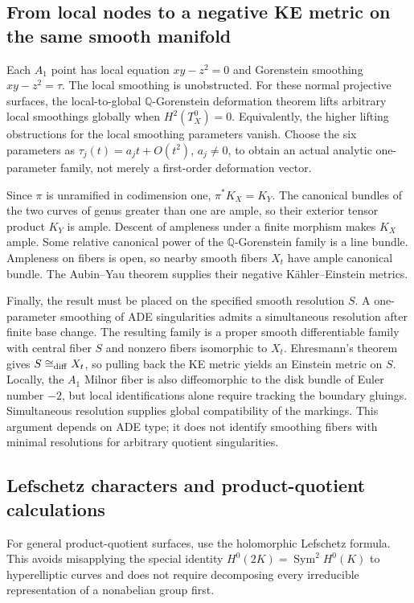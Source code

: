 \documentclass[a4paper,11pt]{article}
\numberwithin{equation}{section}
\theoremstyle{definition}
\begin{document}
\subsection{From local nodes to a negative KE metric on the same smooth manifold}
Each $A_1$ point has local equation $xy-z^2=0$ and Gorenstein smoothing
$xy-z^2=\tau$. The local smoothing is unobstructed.
For these normal projective surfaces, the local-to-global $\mathbb Q$-Gorenstein deformation theorem lifts arbitrary local smoothings globally when
$H^2(T_X^0)=0$.
Equivalently, the higher lifting obstructions for the local smoothing parameters vanish.
Choose the six parameters as $\tau_j(t)=a_jt+O(t^2)$, $a_j\ne0$,
to obtain an actual analytic one-parameter family, not merely a first-order deformation vector.

Since $\pi$ is unramified in codimension one, $\pi^*K_X=K_Y$.
The canonical bundles of the two curves of genus greater than one are ample, so their exterior tensor product $K_Y$ is ample.
Descent of ampleness under a finite morphism makes $K_X$ ample.
Some relative canonical power of the $\mathbb Q$-Gorenstein family is a line bundle.
Ampleness on fibers is open, so nearby smooth fibers $X_t$ have ample canonical bundle.
The Aubin--Yau theorem supplies their negative K\"ahler--Einstein metrics.

Finally, the result must be placed on the specified smooth resolution $S$.
A one-parameter smoothing of ADE singularities admits a simultaneous resolution after finite base change.
The resulting family is a proper smooth differentiable family with central fiber $S$ and nonzero fibers isomorphic to $X_t$.
Ehresmann's theorem gives $S\cong_{\rm diff}X_t$, so pulling back the KE metric yields
an Einstein metric on $S$.
Locally, the $A_1$ Milnor fiber is also diffeomorphic to the disk bundle of Euler number $-2$,
but local identifications alone require tracking the boundary gluings. Simultaneous resolution supplies global compatibility of the markings.
This argument depends on ADE type; it does not identify smoothing fibers with minimal resolutions for arbitrary quotient singularities.


\subsection{Lefschetz characters and product-quotient calculations}
For general product-quotient surfaces, use the holomorphic Lefschetz formula. This avoids misapplying the special identity $H^0(2K)=\operatorname{Sym}^2H^0(K)$ to hyperelliptic curves and does not require decomposing every irreducible representation of a nonabelian group first.
\end{document}

